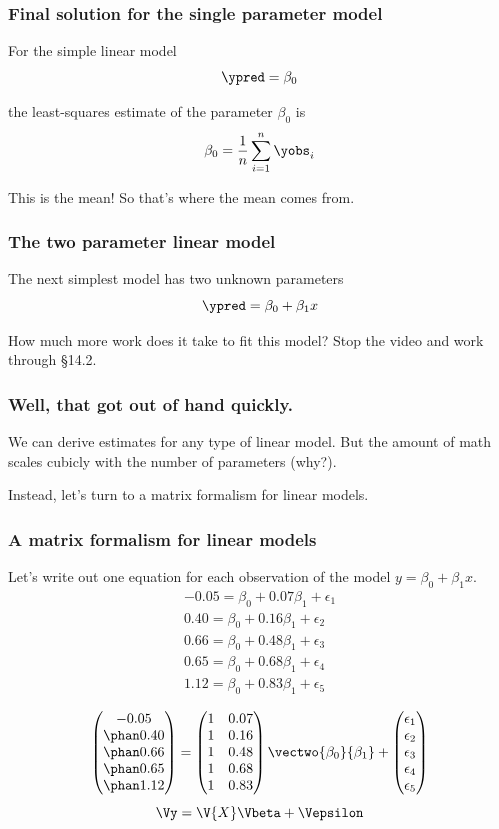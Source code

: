 \documentclass{beamer}
\begin{document}
\begin{frame}
\frametitle{Final solution for the single parameter model}
For the simple linear model
\[ \ypred = \beta_0 \]

the least-squares estimate of the parameter $\beta_0$ is
\[ 	\beta_0 = \frac{1}{n}\sum_{i=1}^n\yobs_i \]

\pause
This is the mean! So that's where the mean comes from.
\end{frame}

\begin{frame}
\frametitle{The two parameter linear model}
The next simplest model has two unknown parameters
\[ \ypred = \beta_0 + \beta_1 x \]

\pause
How much more work does it take to fit this model?
\bigskip
Stop the video and work through \S 14.2.
\end{frame}

\begin{frame}
\frametitle{Well, that got out of hand quickly.}

We can derive estimates for any type of linear model. But the amount of math scales cubicly with the number of parameters (why?).

\bigskip
Instead, let's turn to a matrix formalism for linear models.	
\end{frame}

\begin{frame}
\frametitle{A matrix formalism for linear models}
Let's write out one equation for each observation of the model $y = \beta_0 + \beta_1x$.
\begin{align*}
	-0.05 = \beta_0 + 0.07\beta_1 + \epsilon_1 \\
	0.40 = \beta_0 + 0.16\beta_1 + \epsilon_2 \\
	0.66 = \beta_0 + 0.48\beta_1 + \epsilon_3 \\
	0.65 = \beta_0 + 0.68\beta_1 + \epsilon_4 \\
	1.12 = \beta_0 + 0.83\beta_1 + \epsilon_5
\end{align*}

\pause
\[ \begin{pmatrix} -0.05\\ \phan0.40\\ \phan0.66\\ \phan0.65\\ \phan1.12 \end{pmatrix} = \begin{pmatrix} 1&0.07\\ 1&0.16\\ 1&0.48\\ 1&0.68\\ 1&0.83 \end{pmatrix} \vectwo{\beta_0}{\beta_1} + \begin{pmatrix} \epsilon_1\\ \epsilon_2\\ \epsilon_3\\ \epsilon_4\\ \epsilon_5 \end{pmatrix} \]
\pause
\[ \Vy = \V{X}\Vbeta+\Vepsilon \]	
\end{frame}
\end{document}
